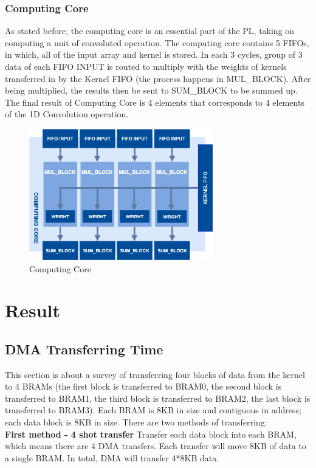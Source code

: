 \documentclass[a4paper, 12pt]{report}
\begin{document}
\subsection{Computing Core}
As stated before, the computing core is an essential part of the PL, taking on computing a unit of convoluted operation. The computing core contains 5 FIFOs, in which, all of the input array and kernel is stored. In each 3 cycles, group of 3 data of each FIFO INPUT is routed to multiply with the weights of kernels transferred in by the Kernel FIFO (the process happens in MUL\_BLOCK). After being multiplied, the results then be sent to SUM\_BLOCK to be summed up. The final result of Computing Core is 4 elements that corresponds to 4 elements of the 1D Convolution operation. 
\begin{figure}[H]
    \centering
    \includegraphics[width = 8cm]{picture/Computing Core/convo_dataflow-Page-2.drawio.png}
    \caption{Computing Core}
    \medskip
\end{figure}
\chapter{Result}
\section{DMA Transferring Time}
This section is about a survey of transferring four blocks of data from the kernel to 4 BRAMs (the
first block is transferred to BRAM0, the second block is transferred to BRAM1, the third block is
transferred to BRAM2, the last block is transferred to BRAM3). Each BRAM is 8KB in size and contiguous in address; each data block is 8KB in size. There are two methods of transferring:\\

\textbf{First method - 4 shot transfer } Transfer each data block into each BRAM, which means there
are 4 DMA transfers. Each transfer will move 8KB of data to a single BRAM. In total, DMA will
transfer 4*8KB data.\\
\end{document}
